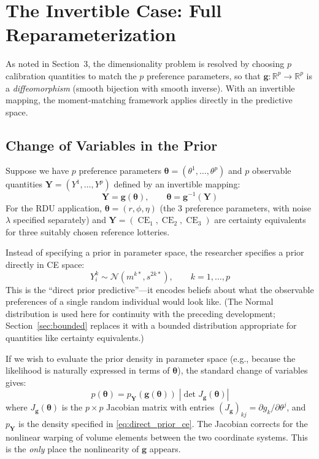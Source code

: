 \documentclass[11pt,a4paper]{article}
\theoremstyle{definition}
\newcommand{\Normal}{\mathcal{N}}
\newcommand{\btheta}{\boldsymbol{\theta}}
\DeclareMathOperator{\CE}{CE}
\begin{document}
\section{The Invertible Case: Full Reparameterization}
\label{sec:invertible}

As noted in Section~3, the dimensionality problem is resolved by choosing $p$
calibration quantities to match the $p$ preference parameters, so that
$\mathbf{g}: \mathbb{R}^p \to \mathbb{R}^p$ is a \emph{diffeomorphism}
(smooth bijection with smooth inverse). With an invertible mapping, the
moment-matching framework applies directly in the predictive space.

\subsection{Change of Variables in the Prior}

Suppose we have $p$ preference parameters
$\btheta = (\theta^1, \ldots, \theta^p)$ and $p$ observable quantities
$\mathbf{Y} = (Y^1, \ldots, Y^p)$ defined by an invertible mapping:
\begin{equation}
    \mathbf{Y} = \mathbf{g}(\btheta), \qquad
    \btheta = \mathbf{g}^{-1}(\mathbf{Y})
\end{equation}
For the RDU application, $\btheta = (r, \phi, \eta)$ (the 3 preference
parameters, with noise $\lambda$ specified separately) and
$\mathbf{Y} = (\CE_1, \CE_2, \CE_3)$ are certainty equivalents for three
suitably chosen reference lotteries.

Instead of specifying a prior in parameter space, the researcher specifies a
prior directly in CE space:
\begin{equation}
    \label{eq:direct_prior_ce}
    Y_i^k \sim \Normal(m^{k*}, s^{2k*}), \qquad k = 1, \ldots, p
\end{equation}
This is the ``direct prior predictive''---it encodes beliefs about what the
observable preferences of a single random individual would look like. (The
Normal distribution is used here for continuity with the preceding development;
Section~\ref{sec:bounded} replaces it with a bounded distribution appropriate
for quantities like certainty equivalents.)

If we wish to evaluate the prior density in parameter space (e.g., because the
likelihood is naturally expressed in terms of $\btheta$), the standard change
of variables gives:
\begin{equation}
    \label{eq:jacobian_prior}
    p(\btheta) = p_{\mathbf{Y}}(\mathbf{g}(\btheta)) \;
    \left|\det J_{\mathbf{g}}(\btheta)\right|
\end{equation}
where $J_{\mathbf{g}}(\btheta)$ is the $p \times p$ Jacobian matrix with
entries $(J_{\mathbf{g}})_{kj} = \partial g_k / \partial \theta^j$, and
$p_{\mathbf{Y}}$ is the density specified in \eqref{eq:direct_prior_ce}. The
Jacobian corrects for the nonlinear warping of volume elements between the two
coordinate systems. This is the \emph{only} place the nonlinearity of
$\mathbf{g}$ appears.
\end{document}

